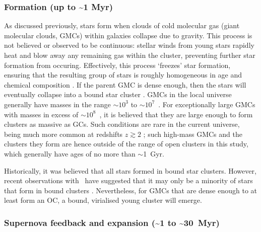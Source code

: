 \subsubsection{Formation (up to \textasciitilde1 Myr)}

As discussed previously, stars form when clouds of cold molecular gas (giant molecular clouds, GMCs) within galaxies collapse due to gravity. This process is not believed or observed to be continuous: stellar winds from young stars rapidly heat and blow away any remaining gas within the cluster, preventing further star formation from occuring. Effectively, this process `freezes' star formation, ensuring that the resulting group of stars is roughly homogeneous in age and chemical composition \citep{lada_embedded_2003,krumholz_how_2020}. If the parent GMC is dense enough, then the stars will eventually collapse into a bound star cluster \citep{portegies_zwart_young_2010,krumholz_star_2019,krumholz_how_2020}. GMCs in the local universe generally have masses in the range $\sim10^3$ to $\sim10^7$~\MSun \citep{krause_physics_2020}. For exceptionally large GMCs with masses in excess of $\sim10^8$~\MSun, it is believed that they are large enough to form clusters as massive as GCs. Such conditions are rare in the current universe, being much more common at redshifts $z \gtrsim 2$ \citep{krumholz_star_2019}; such high-mass GMCs and the clusters they form are hence outside of the range of open clusters in this study, which generally have ages of no more than $\sim$1~Gyr. 

Historically, it was believed that all stars formed in bound star clusters. However, recent observations with \gaia\ have suggested that it may only be a minority of stars that form in bound clusters \citep{ward_not_2019,wright_ob_associations_2020}. Nevertheless, for GMCs that are dense enough to at least form an OC, a bound, virialised young cluster will emerge.


\subsubsection{Supernova feedback and expansion (\textasciitilde1 to \textasciitilde30~Myr)}

